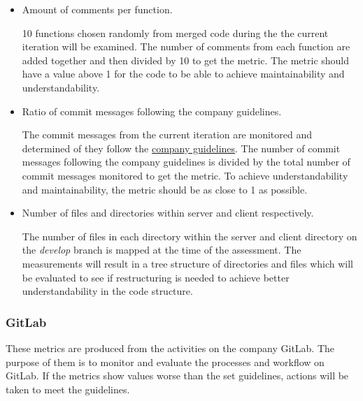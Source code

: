 \begin{itemize}

\item Amount of comments per function.

10 functions chosen randomly from merged code during the the current iteration will be examined. The number of comments from each function are added together and then divided by 10 to get the metric. The metric should have a value above 1 for the code to be able to achieve maintainability and understandability.

\item Ratio of commit messages following the company guidelines.

The commit messages from the current iteration are monitored and determined of they follow the \href{https://gitlab.liu.se/tddc88-company-1-2021/deploy/-/tree/main#semantic-commit-messages}{company guidelines}. The number of commit messages following the company guidelines is divided by the total number of commit messages monitored to get the metric. To achieve understandability and maintainability, the metric should be as close to 1 as possible.

\item Number of files and directories within server and client respectively.

The number of files in each directory within the server and client directory on the \emph{develop} branch is mapped at the time of the assessment. The measurements will result in a tree structure of directories and files which will be evaluated to see if restructuring is needed to achieve better understandability in the code structure.
\end{itemize}

\subsubsection{GitLab}
These metrics are produced from the activities on the company GitLab. The purpose of them is to monitor and evaluate the processes and workflow on GitLab. If the metrics show values worse than the set guidelines, actions will be taken to meet the guidelines.

